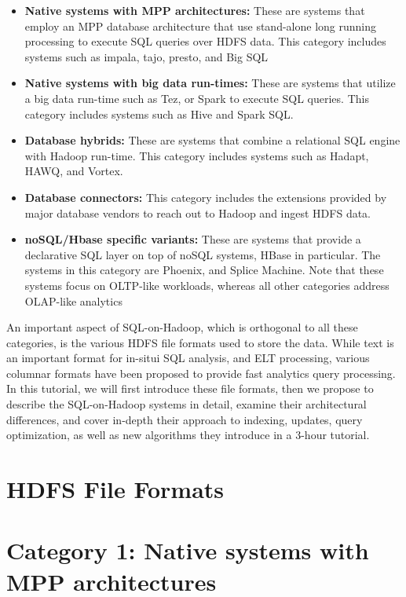 \documentclass{vldb}
\begin{document}
\begin{itemize}
\item{ {\bf Native systems with MPP architectures:} These are systems that employ an MPP database architecture that use stand-alone long running processing to execute SQL queries over HDFS data. This category includes systems such as impala, tajo, presto, and Big SQL}
\item {{\bf Native systems with big data run-times:} These are systems that utilize a big data run-time such as Tez, or Spark to execute SQL queries. This category includes systems such as Hive and Spark SQL.}
\item{{\bf Database hybrids:} These are systems that combine a relational SQL engine with Hadoop run-time. This category includes systems such as Hadapt, HAWQ, and Vortex.}
\item{ {\bf Database connectors:} This category includes the extensions provided by major database vendors to reach out to Hadoop and ingest HDFS data. } 
\item{ {\bf noSQL/Hbase specific variants:} These are systems that provide a declarative SQL layer on top of noSQL systems, HBase in particular. The systems in this category are Phoenix, and Splice Machine. Note that these systems focus on OLTP-like workloads, whereas all other categories address OLAP-like analytics}
\end{itemize}

An important aspect of SQL-on-Hadoop, which is orthogonal to all these categories, is the various HDFS file formats used to store the data. While text is an important format for in-situi SQL analysis, and ELT processing, various columnar formats have been proposed to provide fast analytics query processing. In this tutorial, we will first introduce these file formats, then we propose to describe the SQL-on-Hadoop systems in detail, examine their architectural differences, and cover in-depth their approach to indexing, updates, query optimization, as well as new algorithms they introduce in a 3-hour tutorial. 

\section{HDFS File Formats}

\section{Category 1: Native systems with MPP architectures}
\end{document}
